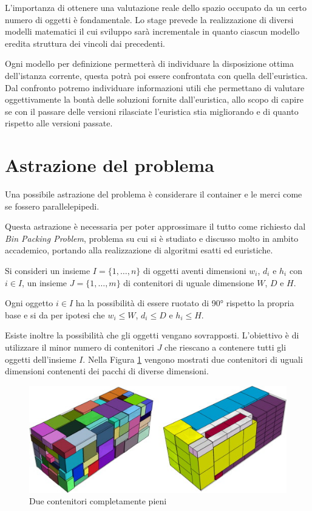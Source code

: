 L'importanza di ottenere una valutazione reale dello spazio occupato da un certo numero di oggetti è fondamentale. Lo stage prevede la realizzazione di diversi modelli matematici il cui sviluppo sarà incrementale in quanto ciascun modello eredita struttura dei vincoli dai precedenti.

Ogni modello per definizione permetterà di individuare la disposizione ottima dell'istanza corrente, questa potrà poi essere confrontata con quella dell'euristica. Dal confronto potremo individuare informazioni utili che permettano di valutare oggettivamente la bontà delle soluzioni fornite dall'euristica, allo scopo di capire se con il passare delle versioni rilasciate l'euristica stia migliorando e di quanto rispetto alle versioni passate.

\section{Astrazione del problema}
Una possibile astrazione del problema è considerare il container e le merci come se fossero parallelepipedi.

Questa astrazione è necessaria per poter approssimare il tutto come richiesto dal \textit{Bin Packing Problem}, problema su cui si è studiato e discusso molto in ambito accademico, portando alla realizzazione di algoritmi esatti ed euristiche.

Si consideri un insieme $I = \{1,\dots,n\}$ di oggetti aventi dimensioni $w_{i}$, $d_{i}$ e $h_{i}$ con $i \in I$, un insieme $J = \{1,\dots,m\}$ di contenitori di uguale dimensione $W$, $D$ e $H$.

Ogni oggetto $i \in I$ ha la possibilità di essere ruotato di 90° rispetto la propria base e si da per ipotesi che $w_{i} \leq W$, $d_{i} \leq D$ e $h_{i} \leq H$.

Esiste inoltre la possibilità che gli oggetti vengano sovrapposti. L'obiettivo è di utilizzare il minor numero di contenitori $J$ che riescano a contenere tutti gli oggetti dell'insieme $I$. 
Nella Figura \ref{bin_packing_figures} vengono mostrati due contenitori di uguali dimensioni contenenti dei pacchi di diverse dimensioni.
\begin{figure}[H]
	\begin{center} \includegraphics[scale=0.8]{figures/bin_packing}
		\caption[Contenitori Bin Packing]{Due contenitori completamente pieni}  
		\label{bin_packing_figures}
	\end{center}
\end{figure}

